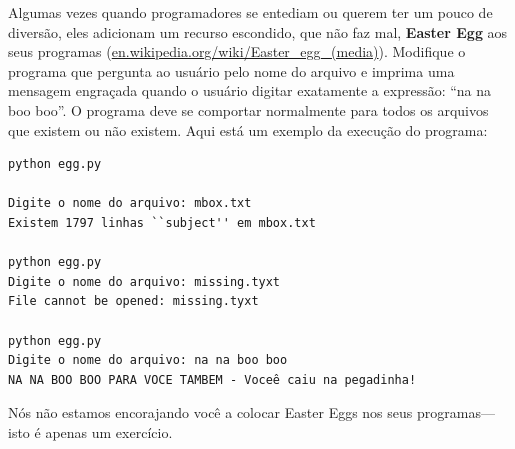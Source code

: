 \begin{ex}
Algumas vezes quando programadores se entediam ou querem ter um pouco
de diversão, eles adicionam um recurso escondido, que não faz mal, 
{\bf Easter Egg} aos seus programas 
(\url{en.wikipedia.org/wiki/Easter_egg_(media)}). Modifique o programa
que pergunta ao usuário pelo nome do arquivo e imprima uma mensagem
engraçada quando o usuário digitar exatamente a expressão: ``na na boo boo''.
O programa deve se comportar normalmente para todos os arquivos que existem
ou não existem. Aqui está um exemplo da execução do programa:

\beforeverb
\begin{verbatim}
python egg.py 

Digite o nome do arquivo: mbox.txt
Existem 1797 linhas ``subject'' em mbox.txt

python egg.py 
Digite o nome do arquivo: missing.tyxt
File cannot be opened: missing.tyxt

python egg.py 
Digite o nome do arquivo: na na boo boo
NA NA BOO BOO PARA VOCE TAMBEM - Voceê caiu na pegadinha!
\end{verbatim}
\afterverb



Nós não estamos encorajando você a colocar Easter Eggs nos seus
programas---isto é apenas um exercício. 

\end{ex}

